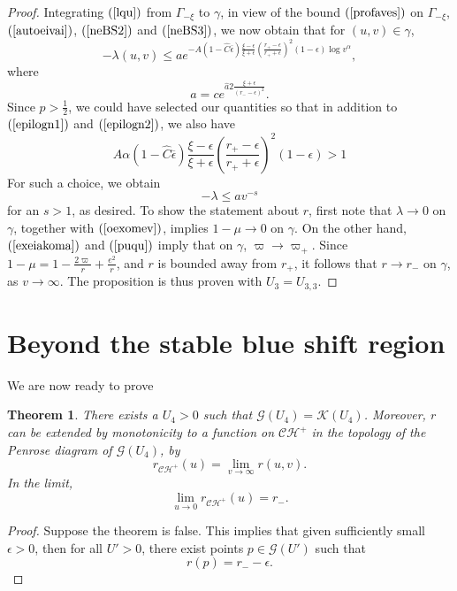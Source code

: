 \documentclass{article}
\newtheorem{theorem}{Theorem}[section]
\begin{document}
{\begin{proof}
Integrating $(\ref{lqu})$ from $\Gamma_{-\xi}$ to $\gamma$, 
in view of the bound $(\ref{profaves})$
on $\Gamma_{-\xi}$, $(\ref{autoeivai})$, $(\ref{neBS2})$ and
$(\ref{neBS3})$,
 we now obtain that for $(u,v)\in
\gamma$,
\begin{equation}
\label{sump}
-\lambda(u,v)\le 
ae^{-A(1-\hat{C}\overline\epsilon)\frac{\xi-\epsilon}{\xi+\epsilon}
\left(\frac{r_+-\epsilon}{r_++\epsilon}\right)^2(1-\epsilon)\log v^{\alpha}},
\end{equation} 
where 
\[
a=ce^{\hat{a}2\frac{\xi+\epsilon}{(r_--\epsilon)^2}}.
\]
Since $p>\frac12$, we could have selected our quantities
so that in addition to $(\ref{epilogn1})$ and $(\ref{epilogn2})$,
we also have
\[
A\alpha(1-\hat{C}\overline\epsilon)
\frac{\xi-\epsilon}{\xi+\epsilon}
\left(\frac{r_+-\epsilon}{r_++\epsilon}\right)^2(1-\epsilon)
>1
\] 
For such a choice, we obtain
\begin{equation}
\label{kalolambda}
-\lambda\le av^{-s}
\end{equation}
for an $s>1$, as desired.
To show the statement about $r$, first note
that $\lambda\to0$ on $\gamma$, together with
$(\ref{oexomev})$,
implies $1-\mu\to0$ on $\gamma$. On the other hand,
$(\ref{exeiakoma})$ and $(\ref{puqu})$ imply that on $\gamma$,
$\varpi\to\varpi_+$. Since $1-\mu=1-\frac{2\varpi}r+\frac{e^2}r$,
and $r$ is bounded away from $r_+$, it follows that
$r\to r_-$ on $\gamma$, as $v\to\infty$. The proposition is thus proven
with $U_3=U_{3,3}$.
\end{proof}

\section{Beyond the stable blue shift region}
\label{bsbsec}
We are now ready to prove
\begin{theorem} 
\label{pera-r}
There exists a $U_4>0$ such that 
$\mathcal{G}(U_4)=\mathcal{K}(U_4)$. 
Moreover, $r$ can be extended
by monotonicity to a function on $\mathcal{CH}^+$ in the topology of the
Penrose diagram of $\mathcal{G}(U_4)$,
by
\begin{equation}
\label{stokwsu}
r_{\mathcal{CH}^+}(u)=\lim_{v\to\infty} r(u,v).
\end{equation}
In the limit,
\[
\lim_{u\to0} r_{\mathcal{CH}^+}(u)=r_-.
\] 
\end{theorem}

\begin{proof}
Suppose the theorem is false. This implies that 
given sufficiently small $\epsilon>0$, then 
for all $U'>0$,
there exist points $p\in\mathcal{G}(U')$ such that
\begin{equation}
\label{avdevisxuei}
r(p)=r_--\epsilon.
\end{equation}


\end{proof}}
\end{document}
